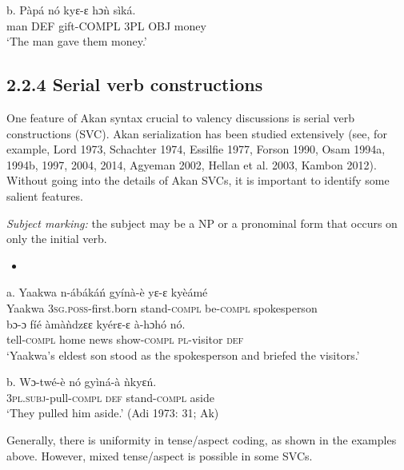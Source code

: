 \documentclass[output=paper]{langsci/langscibook}
\begin{document}
\gll  b.  P\`{a}p\'{a}  n\'{o}  kyɛ-ɛ    hɔ\`{n}    s\`{i}k\'{a}.\\
       man  DEF  gift-COMPL  3PL OBJ  money\\
\glt   ‘The man gave them money.’  
\z

\subsection{2.2.4  Serial verb constructions}

One feature of Akan syntax crucial to valency discussions is serial verb constructions (\textsc{SVC}). Akan serialization has been studied extensively (see, for example, Lord 1973, Schachter 1974, Essilfie 1977, Forson 1990, Osam 1994a, 1994b, 1997, 2004, 2014, Agyeman 2002, Hellan et al. 2003, Kambon 2012). Without going into the details of Akan SVCs, it is important to identify some salient features.

\begin{styleListei}
\emph{Subject marking:} the subject may be a NP or a pronominal form that occurs on only the initial verb. 
\end{styleListei}

\begin{itemize}
\item \end{itemize}
\gll a.  Yaakwa  n-\'{a}b\'{a}k\'{a}\'{n}     gy\'{i}n\`{a}-\`{e}   yɛ-ɛ     ky\`{e}\'{a}m\'{e}\\
       Yaakwa  \textsc{3sg.poss}{}-first.born  stand-\textsc{compl}  be-\textsc{compl}   spokesperson\\
\gll   bɔ-ɔ     f\'{i}\'{e}   \`{a}m\`{a}\`{n}dzɛɛ  ky\'{e}rɛ-ɛ   \`{a}-hɔh\'{o}    n\'{o}.\\
       tell-\textsc{compl}  home  news    show-\textsc{compl}  \textsc{pl}{}-visitor  \textsc{def}\\
\glt   ‘Yaakwa’s eldest son stood as the spokesperson and briefed the visitors.’ \citep[83]{Krampah1970}
\z

\gll  b.  Wɔ-tw\'{e}-\`{e}    n\'{o}  gy\`{i}n\'{a}-\`{a}  \`{n}kyɛ\'{n}.\\
       \textsc{3pl.subj}{}-pull\textsc{{}-compl}  \textsc{def}  stand-\textsc{compl}  aside\\
\glt   ‘They pulled him aside.’ (Adi 1973: 31; Ak)
\z

Generally, there is uniformity in tense/aspect coding, as shown in the examples above. However, mixed tense/aspect is possible in some SVCs. 
\end{document}
